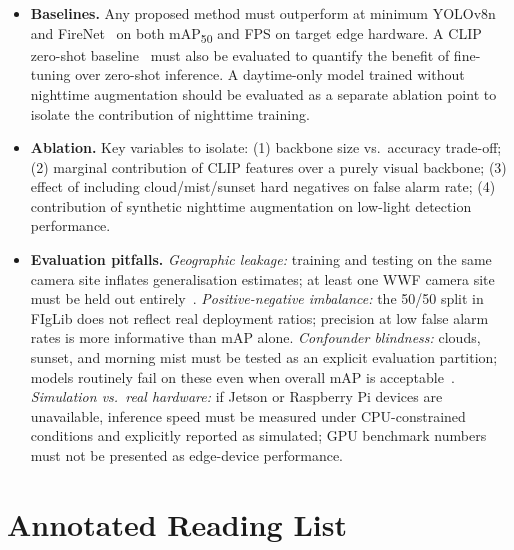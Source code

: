\documentclass[11pt,twocolumn]{article}
\begin{document}
\begin{itemize}[leftmargin=*, itemsep=2pt]
    \item \textbf{Baselines.} Any proposed method must outperform at
          minimum YOLOv8n~\cite{uncertainty2025} and
          FireNet~\cite{firenet2019} on both mAP\textsubscript{50}
          and FPS on target edge hardware. A CLIP zero-shot
          baseline~\cite{clip_llava2026} must also be evaluated to
          quantify the benefit of fine-tuning over zero-shot
          inference. A daytime-only model trained without nighttime
          augmentation should be evaluated as a separate ablation
          point to isolate the contribution of nighttime training.

    \item \textbf{Ablation.} Key variables to isolate: (1) backbone
          size vs.\ accuracy trade-off; (2) marginal contribution of
          CLIP features over a purely visual backbone; (3) effect of
          including cloud/mist/sunset hard negatives on false alarm
          rate; (4) contribution of synthetic nighttime augmentation
          on low-light detection performance.

    \item \textbf{Evaluation pitfalls.}
          \textit{Geographic leakage:} training and testing on the
          same camera site inflates generalisation estimates; at
          least one WWF camera site must be held out
          entirely~\cite{figlib2022}.
          \textit{Positive-negative imbalance:} the 50/50 split in
          FIgLib does not reflect real deployment ratios; precision
          at low false alarm rates is more informative than mAP
          alone.
          \textit{Confounder blindness:} clouds, sunset, and
          morning mist must be tested as an explicit evaluation
          partition; models routinely fail on these even when
          overall mAP is acceptable~\cite{benchmarking2024}.
          \textit{Simulation vs.\ real hardware:} if Jetson or
          Raspberry Pi devices are unavailable, inference speed must
          be measured under CPU-constrained conditions and explicitly
          reported as simulated; GPU benchmark numbers must not be
          presented as edge-device performance.
\end{itemize}

\section{Annotated Reading List}
\label{sec:readings}
\end{document}
